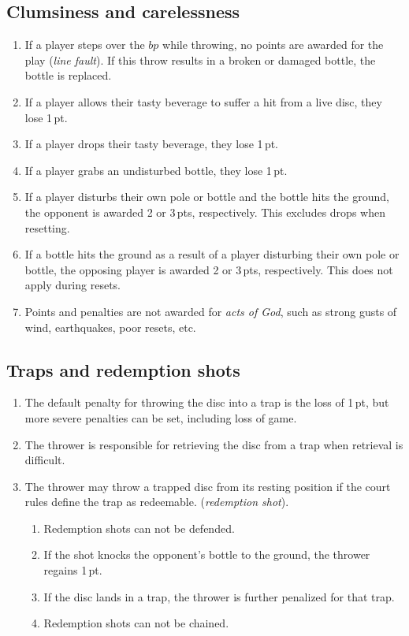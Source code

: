 \documentclass[11pt,letterpaper,twocolumn,english,DIV=calc]{scrartcl}
\begin{document}
\subsection{\label{subsec:clumsiness-and-carelessness}Clumsiness and carelessness}
\begin{enumerate}[leftmargin=2.8em, label=\thesubsection.\arabic*]
	\item If a player steps over the $bp$ while throwing, no points are awarded for the play (\emph{line fault}). 
	If this throw results in a broken or damaged bottle, the bottle is replaced.
	
	\item If a player allows their tasty beverage to suffer a hit from a live disc, they lose 1\,pt.
	\item If a player drops their tasty beverage, they lose 1\,pt.
	\item If a player grabs an undisturbed bottle, they lose 1\,pt.
	\item If a player disturbs their own pole or bottle and the bottle hits the ground, the opponent is awarded 2 or 3\,pts, respectively.
	This excludes drops when resetting.
	\item If a bottle hits the ground as a result of a player disturbing their own pole or bottle, the opposing player is awarded 2 or 3\,pts, respectively.
	This does not apply during resets.
	\item Points and penalties are not awarded for \emph{acts of God}, such as strong gusts of wind, earthquakes, poor resets, etc.
\end{enumerate}

\subsection{\label{subsec:traps}Traps and redemption shots}
\begin{enumerate}[leftmargin=2.8em, label=\thesubsection.\arabic*]
	\item The default penalty for throwing the disc into a trap is the loss of 1\,pt, but more severe penalties can be set, including loss of game.
	\item The thrower is responsible for retrieving the disc from a trap when retrieval is difficult.
	\item The thrower may throw a trapped disc from its resting position if the court rules define the trap as redeemable. (\emph{redemption shot}).

	\begin{enumerate}
		\item Redemption shots can not be defended.
		\item If the shot knocks the opponent's bottle to the ground, the thrower regains 1\,pt.
		\item If the disc lands in a trap, the thrower is further penalized for that trap.
		\item Redemption shots can not be chained.
	\end{enumerate}
\end{enumerate}
\end{document}

